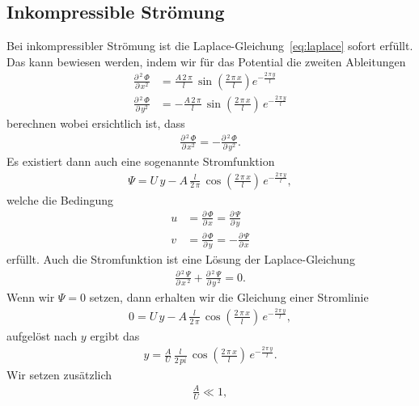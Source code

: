 \subsection{Inkompressible Strömung}
Bei inkompressibler Strömung ist die
Laplace-Gleichung~\eqref{eq:laplace} sofort erfüllt.
Das kann bewiesen werden, indem wir für das Potential
die zweiten Ableitungen
\begin{align*}
    \frac{\partial\,^2\,\Phi}{\partial\,x^2}
    &= \frac{A\,2\,\pi}{l}\,\sin\left(\frac{2\,\pi\,x}{l}\right)
    e^{-\frac{2\,\pi\,y}{l}} \\
    \frac{\partial\,^2\,\Phi}{\partial\,y^2}
    &= -\frac{A\,2\,\pi}{l}\,\sin\left(\frac{2\,\pi\,x}{l}\right)
    \,e^{-\frac{2\,\pi\,y}{l}}
\end{align*}
berechnen wobei ersichtlich ist, dass
\begin{align*}
    \frac{\partial\,^2\,\Phi}{\partial\,x^2}
    =
    -\frac{\partial\,^2\,\Phi}{\partial\,y^2}.
\end{align*}
Es existiert dann auch eine sogenannte Stromfunktion
\begin{align*}
    \Psi
    =
    U\,y - A\,\frac{l}{2\,\pi}\,\cos\left(\frac{2\,\pi\,x}{l}\right)
    \,e^{-\frac{2\,\pi\,y}{l}},
\end{align*}
welche die Bedingung
\begin{align*}
    u 
    &=
    \frac{\partial\,\Phi}{\partial\,x}
    =
    \frac{\partial\,\Psi}{\partial\,y}
    \\
    v
    &=
    \frac{\partial\,\Phi}{\partial\,y}
    =
    -\frac{\partial\,\Psi}{\partial\,x}
\end{align*}
erfüllt.
Auch die Stromfunktion ist eine Lösung der Laplace-Gleichung
\begin{align*}
    \frac{\partial\,^2\,\Psi}{\partial\,x\,^2}
    +
    \frac{\partial\,^2\,\Psi}{\partial\,y\,^2}
    =
    0.
\end{align*}
Wenn wir $\Psi = 0$ setzen, dann erhalten wir die Gleichung
einer Stromlinie
\begin{align}
    0 = U\,y - A\,\frac{l}{2\,\pi}\,
    \cos\left(\frac{2\,\pi\,x}{l}\right)\,
    e^{-\frac{2\,\pi\,y}{l}},\label{eq:stromlinie}
\end{align}
aufgelöst nach $y$ ergibt das
\begin{align*}
    y
    =
    \frac{A}{U}\,\frac{l}{2\,pi}\,
    \cos\left(\frac{2\,\pi\,x}{l}\right)\,
    e^{-\frac{2\,\pi\,y}{l}}.
\end{align*}
Wir setzen zusätzlich 
\begin{align*}
    \frac{A}{U} \ll 1,
\end{align*}
